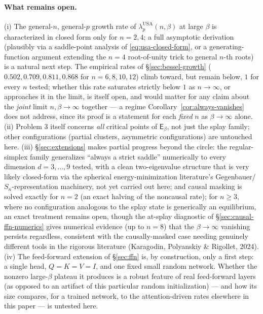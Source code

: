 \documentclass[11pt]{article}
\begin{document}
\paragraph{What remains open.} (i) The general-$n$, general-$p$ growth rate of $\lambda_p^{\mathrm{USA}}(n,\beta)$ at large $\beta$ is characterized in closed form only for $n=2,4$; a full asymptotic derivation (plausibly via a saddle-point analysis of \eqref{eq:usa-closed-form}, or a generating-function argument extending the $n=4$ root-of-unity trick to general $n$-th roots) is a natural next step. The empirical rates of \S\ref{sec:bessel-growth} ($0.502,0.709,0.811,0.868$ for $n=6,8,10,12$) climb toward, but remain below, $1$ for every $n$ tested; whether this rate saturates strictly below $1$ as $n\to\infty$, or approaches it in the limit, is itself open, and would matter for any claim about the \emph{joint} limit $n,\beta\to\infty$ together --- a regime Corollary~\ref{cor:always-vanishes} does not address, since its proof is a statement for each \emph{fixed} $n$ as $\beta\to\infty$ alone. (ii) Problem 3 itself concerns \emph{all} critical points of $\mathsf{E}_\beta$, not just the splay family; other configurations (partial clusters, asymmetric configurations) are untouched here. (iii) \S\ref{sec:extensions} makes partial progress beyond the circle: the regular-simplex family generalizes ``always a strict saddle'' numerically to every dimension $d=3,\dots,9$ tested, with a clean two-eigenvalue structure that is very likely closed-form via the spherical energy-minimization literature's Gegenbauer/$S_n$-representation machinery, not yet carried out here; and causal masking is solved exactly for $n=2$ (an exact halving of the noncausal rate); for $n\ge3$, where no configuration analogous to the splay state is generically an equilibrium, an exact treatment remains open, though the at-splay diagnostic of \S\ref{sec:causal-ffn-numerics} gives numerical evidence (up to $n=8$) that the $\beta\to\infty$ vanishing persists regardless, consistent with the causally-masked case needing genuinely different tools in the rigorous literature (Karagodin, Polyanskiy \& Rigollet, 2024). (iv) The feed-forward extension of \S\ref{sec:ffn} is, by construction, only a first step: a single head, $Q=K=V=I$, and one fixed small random network. Whether the nonzero large-$\beta$ plateau it produces is a robust feature of real feed-forward layers (as opposed to an artifact of this particular random initialization) --- and how its size compares, for a trained network, to the attention-driven rates elsewhere in this paper --- is untested here.
\end{document}

